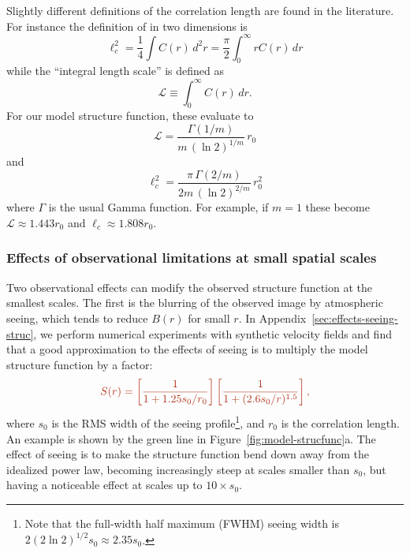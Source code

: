 \documentclass[fleqn,usenatbib, useAMS, a4paper]{mnras}
\newcommand\startNEW{\color{NEWcolor}}
\newcommand\stopNEW{\color{black}}
\begin{document}
\newcommand\LL{\ensuremath{\mathcal{L}}}
Slightly different definitions of the correlation length
are found in the literature.
For instance the definition of \citet{Jaupart:2022i}
in two dimensions is
\begin{equation}
  \label{eq:2}
  \ell_c^2 = \frac{1}{4} \int C(r) \, d^2 r
  = \frac{\pi}{2} \int_0^\infty r C(r) \, d r
\end{equation}
while the ``integral length scale'' \citep{Pope:2000p} is defined
as
\begin{equation}
  \label{eq:3}
  \LL \equiv \int_0^\infty C(r)\, dr .
\end{equation}
For our model structure function, these evaluate to
\begin{equation}
  \label{eq:4}
  \LL = \frac{\Gamma(1/m)}{m\, (\ln 2)^{1/m}} \, r_0
\end{equation}
and
\begin{equation}
  \label{eq:4}
   \ell_c^2 = \frac{\pi\,  \Gamma(2/m)}{2m\, (\ln 2)^{2/m}} \, r_0^2
\end{equation}
where \(\Gamma\) is the usual Gamma function.
For example, if \(m = 1\) these become \(\LL \approx 1.443 r_0\)
and \(\ell_c \approx 1.808 r_0\). 

\subsubsection{Effects of observational limitations at small spatial scales}
\label{sec:effect-observ-limit}

Two observational effects can modify the observed structure function at the smallest scales.
The first is the blurring of the observed image by atmospheric seeing,
which tends to reduce \(B(r)\) for small \(r\).
In Appendix~\ref{sec:effects-seeing-struc}, we perform numerical experiments
with synthetic velocity fields and find that
a good approximation to the effects of seeing is to multiply
the model structure function by a factor:
\begin{equation}\label{eq:ffs}
  \startNEW
  S(r) =
  \left[ \frac{1}{1 + 1.25 s_0 / r_0} \right]
  \left[ \frac{1}{1 + (2.6 s_0 / r)^{1.5}} \right]
  ,
  \stopNEW
\end{equation}
where \(s_0\) is the RMS width of the seeing profile\footnote{%
  Note that the full-width half maximum (FWHM) seeing width is
  \(2 (2 \ln 2)^{1/2} s_0 \approx 2.35 s_0\).
},
and \(r_0\) is the correlation length.
An example is shown by the green line in Figure~\ref{fig:model-strucfunc}a.
The effect of seeing is to make the structure function 
bend down away from the idealized power law, 
becoming increasingly steep at scales smaller than \(s_0\),
but having a noticeable effect at scales up to \(10 \times s_0\).
\end{document}

